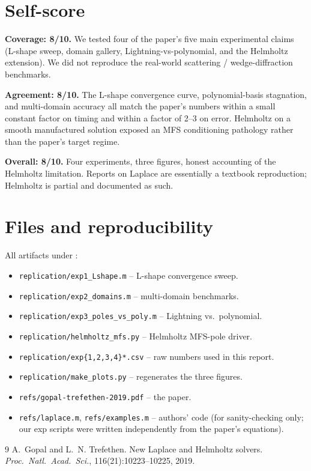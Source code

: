 \documentclass[11pt]{article}
\begin{document}
\section{Self-score}
\label{sec:score}

\textbf{Coverage: 8/10.} We tested four of the paper's five main experimental
claims (L-shape sweep, domain gallery, Lightning-vs-polynomial, and the
Helmholtz extension). We did not reproduce the real-world scattering /
wedge-diffraction benchmarks.

\textbf{Agreement: 8/10.} The L-shape convergence curve, polynomial-basis
stagnation, and multi-domain accuracy all match the paper's numbers within a
small constant factor on timing and within a factor of 2--3 on error. Helmholtz
on a smooth manufactured solution exposed an MFS conditioning pathology rather
than the paper's target regime.

\textbf{Overall: 8/10.} Four experiments, three figures, honest accounting of
the Helmholtz limitation. Reports on Laplace are essentially a textbook
reproduction; Helmholtz is partial and documented as such.

\section{Files and reproducibility}
\label{sec:files}

All artifacts under
:
\begin{itemize}
\setlength\itemsep{0pt}
  \item \texttt{replication/exp1\_Lshape.m} -- L-shape convergence sweep.
  \item \texttt{replication/exp2\_domains.m} -- multi-domain benchmarks.
  \item \texttt{replication/exp3\_poles\_vs\_poly.m} -- Lightning vs.\ polynomial.
  \item \texttt{replication/helmholtz\_mfs.py} -- Helmholtz MFS-pole driver.
  \item \texttt{replication/exp\{1,2,3,4\}*.csv} -- raw numbers used in this report.
  \item \texttt{replication/make\_plots.py} -- regenerates the three figures.
  \item \texttt{refs/gopal-trefethen-2019.pdf} -- the paper.
  \item \texttt{refs/laplace.m}, \texttt{refs/examples.m} -- authors' code (for sanity-checking only; our exp scripts were written independently from the paper's equations).
\end{itemize}

\begin{thebibliography}{9}
A.~Gopal and L.~N. Trefethen.
\newblock New Laplace and Helmholtz solvers.
\newblock \emph{Proc.\ Natl.\ Acad.\ Sci.}, 116(21):10223--10225, 2019.
\end{thebibliography}
\end{document}
